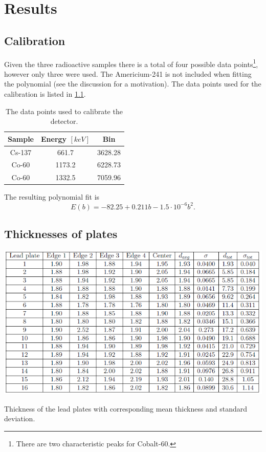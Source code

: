 \documentclass[12pt]{report}
\begin{document}
\chapter{Results}

\section{Calibration}
Given the three radioactive samples there is a total of four possible data points\footnote{There are two characteristic peaks for Cobalt-60.}, however only three were used. The Americium-241 is not included when fitting the polynomial (see the discussion for a motivation). The data points used for the calibration is listed in \ref{tab:cal}.

\begin{table}[ht]
    \centering
    \begin{tabular}{|c|c|c|}
    \hline
        Sample  &    Energy $[keV]$  &    Bin \\ \hline
        Cs-137  &    661.7           &    3628.28 \\ \hline
        Co-60   &    1173.2          &    6228.73 \\ \hline
        Co-60   &    1332.5          &    7059.96 \\ \hline
    \end{tabular}
    \caption{The data points used to calibrate the detector.}
    \label{tab:cal}
\end{table}

The resulting polynomial fit is
\begin{equation}
    E(b) = -82.25 + 0.211b - 1.5\cdot10^{-6}b^2.
\end{equation}

\section{Thicknesses of plates}
\begin{table}[ht]
    \centering
    \includegraphics[width=1\textwidth]{t1}
    \caption{Thickness of the lead plates with corresponding mean thickness and standard deviation.}
    \label{tab:t1}
\end{table}
\end{document}
